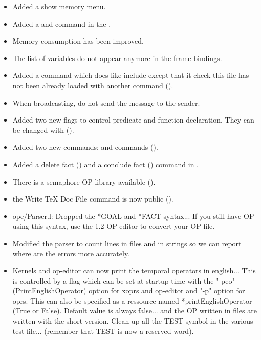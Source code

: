 \begin{itemize}
\item Added a show memory menu.

\item Added a  and  command in the \XPK{}.

\item Memory consumption has been improved.

\item The list of variables do not appear anymore in the frame bindings.

\item Added a  command which does like include except that it
check this file has not been already loaded with another  command
().

\item When broadcasting, do not send the message to the sender.

\item Added two new flags to control predicate and function
declaration. They can be changed with 
().

\item Added two new commands:  and  commands (). 

\item Added a delete fact () and a conclude fact
() command in \XPK{}.

\item There is a semaphore OP library available ().

\item the Write TeX Doc File command is now public ().

\item ope/Parser.l: Dropped the *GOAL and *FACT syntax... If you still
have OP using this syntax, use the 1.2 OP editor to convert your
OP file. 

\item Modified the parser to count lines in files and in strings so we
can report where are the errors more accurately. 

\item Kernels and op-editor can now print the temporal operators in
english... This is controlled by a flag which can be set at startup time with
the "-peo" (PrintEnglishOperator) option for xoprs and op-editor and "-p"
option for oprs. This can also be specified as a ressource named
*printEnglishOperator (True or False). Default value is always false... and the
OP written in files are written with the short version. Clean up all the TEST
symbol in the various test file... (remember that TEST is now a reserved word).


\end{itemize}
